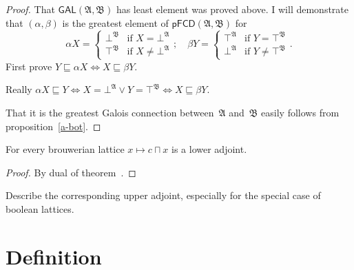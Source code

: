 \begin{proof}
That $\mathsf{GAL} (\mathfrak{A}, \mathfrak{B})$ has least element was proved
above. I will demonstrate that $(\alpha , \beta)$
is the greatest element of $\mathsf{pFCD} (\mathfrak{A}, \mathfrak{B})$ for
\[ \alpha X = \begin{cases}
     \bot^{\mathfrak{B}} & \text{if } X = \bot^{\mathfrak{A}}\\
     \top^{\mathfrak{B}} & \text{if } X \neq \bot^{\mathfrak{A}}
   \end{cases} ; \quad
   \beta Y = \begin{cases}
     \top^{\mathfrak{A}} & \text{if } Y = \top^{\mathfrak{B}}\\
     \bot^{\mathfrak{A}} & \text{if } Y \neq \top^{\mathfrak{B}}
   \end{cases} . \]
First prove $Y \sqsubseteq \alpha X \Leftrightarrow X \sqsubseteq \beta Y$.

Really $\alpha X\sqsubseteq Y \Leftrightarrow X=\bot^{\mathfrak{A}}\lor Y=\top^{\mathfrak{B}} \Leftrightarrow X \sqsubseteq \beta Y$.

That it is the greatest Galois connection between~$\mathfrak{A}$ and~$\mathfrak{B}$ easily follows from proposition~\ref{a-bot}.
\end{proof}

\begin{thm}\label{gal-id-ex}
  For every brouwerian lattice $x \mapsto c \sqcap x$ is a lower adjoint.
\end{thm}

\begin{proof}
  By dual of theorem~.
\end{proof}

\begin{xca}
  Describe the corresponding upper adjoint, especially for the special case of
  boolean lattices.
\end{xca}

\section{Definition}

